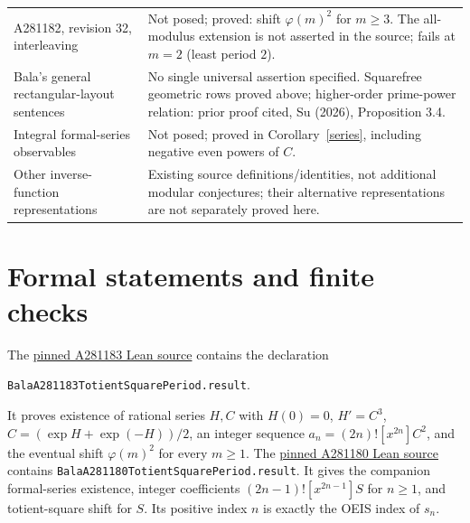 \documentclass[11pt]{article}
\begin{document}
\begin{center}
\begin{tabular}{p{.28\linewidth}p{.62\linewidth}}
A281182, revision 32, interleaving & Not posed; proved: shift $\varphi(m)^2$ for $m\ge3$. The all-modulus extension is not asserted in the source; fails at $m=2$ (least period $2$). \\
Bala's general rectangular-layout sentences & No single universal assertion specified. Squarefree geometric rows proved above; higher-order prime-power relation: prior proof cited, Su (2026), Proposition 3.4. \\
Integral formal-series observables & Not posed; proved in Corollary~\ref{series}, including negative even powers of $C$. \\
Other inverse-function representations & Existing source definitions/identities, not additional modular conjectures; their alternative representations are not separately proved here. \\
\bottomrule
\end{tabular}
\end{center}

\section{Formal statements and finite checks}
The \href{https://github.com/the-omega-institute/trureturing/blob/92de86888730265f84e24d28bdb67546c543a966/D5/S1/Recurrence/Periodic/BalaA281183TotientSquarePeriod.lean}{pinned A281183 Lean source}
contains the declaration
\begin{center}\texttt{BalaA281183TotientSquarePeriod.result}.\end{center}
It proves existence of rational series $H,C$ with $H(0)=0$,
$H'=C^3$, $C=(\exp H+\exp(-H))/2$, an integer sequence
$a_n=(2n)![x^{2n}]C^2$, and the eventual shift $\varphi(m)^2$
for every $m\ge1$.
The \href{https://github.com/the-omega-institute/trureturing/blob/92de86888730265f84e24d28bdb67546c543a966/D5/S1/Recurrence/Periodic/BalaA281180TotientSquarePeriod.lean}{pinned A281180 Lean source}
contains \texttt{BalaA281180TotientSquarePeriod.result}.
It gives the companion formal-series existence, integer coefficients
$(2n-1)![x^{2n-1}]S$ for $n\ge1$, and totient-square shift for $S$.
Its positive index $n$ is exactly the OEIS index of $s_n$.
\end{document}
